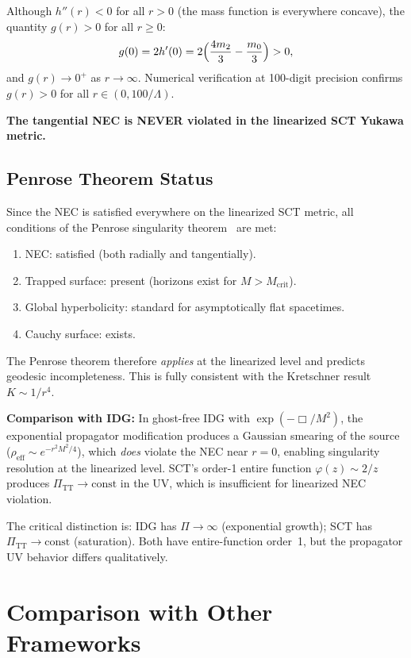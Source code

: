 \documentclass[11pt,a4paper]{article}
\theoremstyle{definition}
\theoremstyle{remark}
\newcommand{\Lam}{\Lambda}
\newcommand{\PiTT}{\Pi_{\mathrm{TT}}}
\begin{document}
Although $h''(r) < 0$ for all $r > 0$ (the mass function is everywhere concave),
the quantity $g(r) > 0$ for all $r \geq 0$:
\begin{equation}
  g(0) = 2h'(0) = 2\Bigl(\frac{4m_2}{3} - \frac{m_0}{3}\Bigr) > 0,
\end{equation}
and $g(r) \to 0^+$ as $r \to \infty$. Numerical verification at 100-digit precision
confirms $g(r) > 0$ for all $r \in (0, 100/\Lam)$.

\textbf{The tangential NEC is NEVER violated in the linearized SCT Yukawa metric.}

\subsection{Penrose Theorem Status}

Since the NEC is satisfied everywhere on the linearized SCT metric, all conditions
of the Penrose singularity theorem~\cite{Penrose1965} are met:
\begin{enumerate}
  \item NEC: satisfied (both radially and tangentially).
  \item Trapped surface: present (horizons exist for $M > M_{\mathrm{crit}}$).
  \item Global hyperbolicity: standard for asymptotically flat spacetimes.
  \item Cauchy surface: exists.
\end{enumerate}

The Penrose theorem therefore \emph{applies} at the linearized level and predicts
geodesic incompleteness. This is fully consistent with the Kretschner result
$K \sim 1/r^4$.

\textbf{Comparison with IDG:} In ghost-free IDG with $\exp(-\Box/M^2)$, the
exponential propagator modification produces a Gaussian smearing of the source
($\rho_{\mathrm{eff}} \sim e^{-r^2 M^2/4}$), which \emph{does} violate the NEC
near $r = 0$, enabling singularity resolution at the linearized level. SCT's
order-1 entire function $\varphi(z) \sim 2/z$ produces $\PiTT \to \mathrm{const}$
in the UV, which is insufficient for linearized NEC violation.

The critical distinction is: IDG has $\Pi \to \infty$ (exponential growth);
SCT has $\PiTT \to \mathrm{const}$ (saturation). Both have entire-function
order~1, but the propagator UV behavior differs qualitatively.

\section{Comparison with Other Frameworks}
\end{document}

